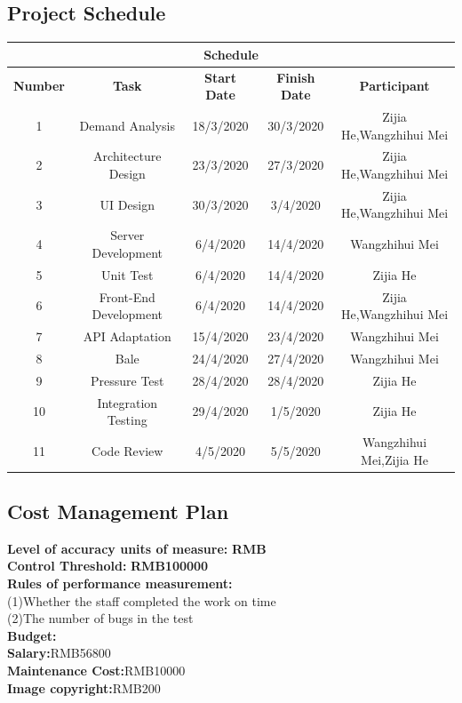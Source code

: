 \documentclass[runningheads]{llncs}
\begin{document}
\subsection{Project Schedule}
\begin{table}
\centering
\begin{tabular}{|c|c|c|c|c|}
\hline
\multicolumn{5}{|c|}{\textbf{Schedule}}\\ %
\hline
\textbf{Number}&\textbf{Task}&\textbf{Start Date}&\textbf{Finish Date}&\textbf{Participant}\\
\hline
1&Demand Analysis&18/3/2020&30/3/2020&Zijia He,Wangzhihui Mei\\
\hline
2&Architecture Design&23/3/2020&27/3/2020&Zijia He,Wangzhihui Mei\\
\hline
3&UI Design&30/3/2020&3/4/2020&Zijia He,Wangzhihui Mei\\
\hline
4&Server Development&6/4/2020&14/4/2020&Wangzhihui Mei\\
\hline
5&Unit Test&6/4/2020&14/4/2020&Zijia He\\
\hline
6&Front-End Development&6/4/2020&14/4/2020&Zijia He,Wangzhihui Mei\\
\hline
7&API Adaptation&15/4/2020&23/4/2020&Wangzhihui Mei\\
\hline
8&Bale&24/4/2020&27/4/2020&Wangzhihui Mei\\
\hline
9&Pressure Test&28/4/2020&28/4/2020&Zijia He\\
\hline
10&Integration Testing&29/4/2020&1/5/2020&Zijia He\\
\hline
11&Code Review&4/5/2020&5/5/2020&Wangzhihui Mei,Zijia He\\
\hline
\end{tabular}
\end{table}

\subsection{Cost Management Plan}
\textbf{Level of accuracy units of measure:} \textbf{RMB}\\
\textbf{Control Threshold:} \textbf{RMB100000}\\
\textbf{Rules of performance measurement:}\\
(1)Whether the staff completed the work on time\\
(2)The number of bugs in the test\\
\textbf{Budget:}\\
\textbf{Salary:}RMB56800\\
\textbf{Maintenance Cost:}RMB10000\\
\textbf{Image copyright:}RMB200
\end{document}
